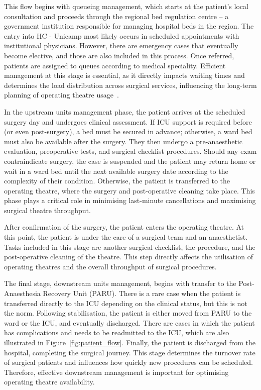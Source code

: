 \documentclass[review,3p,authoryear]{elsarticle}
\begin{document}
This flow begins with queueing management, which starts at the patient's local consultation and proceeds through the regional bed regulation centre -- a government institution responsible for managing hospital beds in the region. 
The entry into HC - Unicamp most likely occurs in scheduled appointments with institutional physicians. 
However, there are emergency cases that eventually become elective, and those are also included in this process.
Once referred, patients are assigned to queues according to medical speciality. 
Efficient management at this stage is essential, as it directly impacts waiting times and determines the load distribution across surgical services, influencing the long-term planning of operating theatre usage~\citep{Siqueira2018INTO}.

In the upstream units management phase, the patient arrives at the scheduled surgery day and undergoes clinical assessment. 
If ICU support is required before (or even post-surgery), a bed must be secured in advance; otherwise, a ward bed must also be available after the surgery. 
They then undergo a pre-anaesthetic evaluation, preoperative tests, and surgical checklist procedures. 
Should any exam contraindicate surgery, the case is suspended and the patient may return home or wait in a ward bed until the next available surgery date according to the complexity of their condition.
Otherwise, the patient is transferred to the operating theatre, where the surgery and post-operative cleaning take place.
This phase plays a critical role in minimising last-minute cancellations and maximising surgical theatre throughput.

After confirmation of the surgery, the patient enters the operating theatre.
At this point, the patient is under the care of a surgical team and an anaesthetist.
Tasks included in this stage are another surgical checklist, the procedure, and the post-operative cleaning of the theatre.
This step directly affects the utilisation of operating theatres and the overall throughput of surgical procedures.

The final stage, downstream units management, begins with transfer to the Post-Anaesthesia Recovery Unit (PARU). 
There is a rare case when the patient is transferred directly to the ICU depending on the clinical status, but this is not the norm.
Following stabilisation, the patient is either moved from PARU to the ward or the ICU, and eventually discharged. 
There are cases in which the patient has complications and needs to be readmitted to the ICU, which are also illustrated in Figure~\ref{fig:patient_flow}.
Finally, the patient is discharged from the hospital, completing the surgical journey.
This stage determines the turnover rate of surgical patients and influences how quickly new procedures can be scheduled. 
Therefore, effective downstream management is important for optimising operating theatre availability. 
\end{document}
